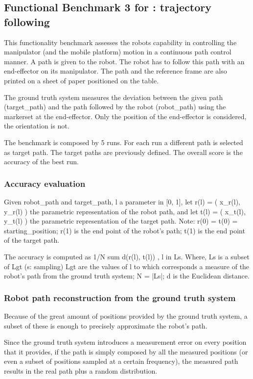 \documentclass[a4paper]{article}
\begin{document}
\subsection{Functional Benchmark 3 for \ro@Work: trajectory following}
\label{sec:fbm3w}

This functionality benchmark assesses the robots capability in controlling the manipulator (and the mobile platform) motion in a continuous path control manner. A path is given to the robot. The robot has to follow this path with an end-effector on its manipulator. The path and the reference frame are also printed on a sheet of paper positioned on the table.

The ground truth system measures the deviation between the given path (target\_path) and the path followed by the robot (robot\_path) using the markerset at the end-effector.
Only the position of the end-effector is considered, the orientation is not.

The benchmark is composed by 5 runs. For each run a different path is selected as target path.
The target paths are previously defined.
The overall score is the accuracy of the best run.


\subsubsection{Accuracy evaluation}
Given robot\_path and target\_path, l a parameter in [0, 1],
let r(l) = ( x\_r(l), y\_r(l) ) the parametric representation of the robot path, and
let t(l) = ( x\_t(l), y\_t(l) ) the parametric representation of the target path.
Note: r(0) = t(0) = starting\_position; r(1) is the end point of the robot's path; t(1) is the end point of the target path.

The accuracy is computed as 1/N sum{ d(r(l), t(l)) }, l in Ls.
Where,
 Ls is a subset of Lgt (s: sampling)
 Lgt are the values of l to which corresponds a measure of the robot's path from the ground truth system;
 N = |Ls|;
 d is the Euclidean distance.


\subsubsection{Robot path reconstruction from the ground truth system}
Because of the great amount of positions provided by the ground truth system, a subset of these is enough to precisely approximate the robot's path.

Since the ground truth system introduces a measurement error on every position that it provides, if the path is simply composed by all the measured positions (or even a subset of positions sampled at a certain frequency), the measured path results in the real path plus a random distribution.
\end{document}
